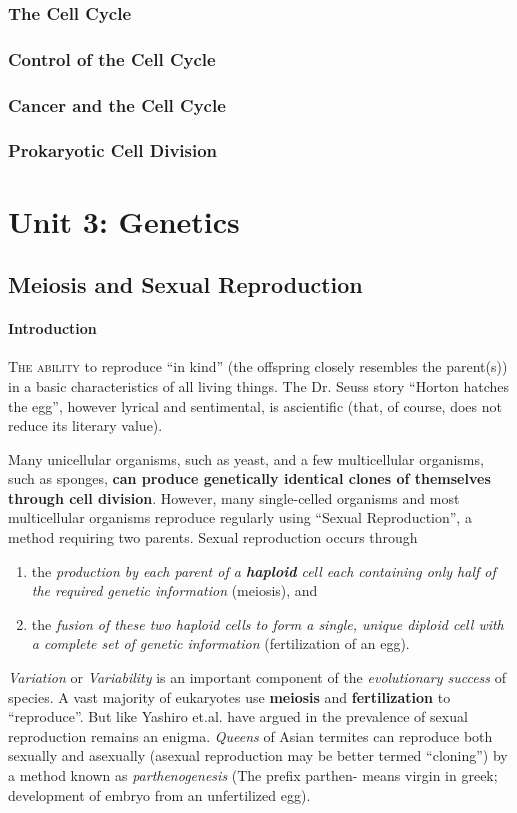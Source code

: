 \documentclass[12pt]{article}
\begin{document}
\subsubsection{The Cell Cycle}
\subsubsection{Control of the Cell Cycle}
\subsubsection{Cancer and the Cell Cycle}
\subsubsection{Prokaryotic Cell Division}

\section{Unit 3: Genetics}
\subsection{Meiosis and Sexual Reproduction}
\paragraph{Introduction}
\lettrine[lines=3]{T}{he ability} to reproduce ``in kind'' (the offspring closely resembles the parent(s)) in a basic characteristics of all living things. The Dr. Seuss story ``Horton hatches the egg'', however lyrical and sentimental, is ascientific (that, of course, does not reduce its literary value).

Many unicellular organisms, such as yeast, and a few multicellular organisms, such as sponges, \textbf{can produce genetically identical clones of themselves through cell division}. However, many single-celled organisms and most multicellular organisms reproduce regularly using ``Sexual Reproduction'', a method requiring two parents. Sexual reproduction occurs through
\begin{enumerate}
    \item the \emph{production by each parent of a \textbf{haploid} cell each containing only half of the required genetic information} (meiosis), and
    \item the \emph{fusion of these two haploid cells to form a single, unique diploid cell with a complete set of genetic information} (fertilization of an egg).
\end{enumerate}
\emph{Variation} or \emph{Variability} is an important component of the \emph{evolutionary success} of species. A vast majority of eukaryotes use \textbf{meiosis} and \textbf{fertilization} to ``reproduce''. But like Yashiro et.al. have argued in \cite{yashiro-matsuura} the prevalence of sexual reproduction remains an enigma. \emph{Queens} of Asian termites can reproduce both sexually and asexually (asexual reproduction may be better termed ``cloning'') by a method known as \emph{parthenogenesis} (The prefix parthen- means virgin in greek; development of embryo from an unfertilized egg).
\end{document}
